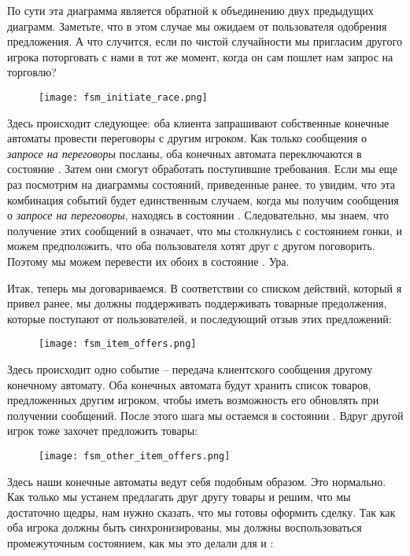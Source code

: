 По сути эта диаграмма является обратной к объединению двух предыдущих диаграмм.
Заметьте, что в этом случае мы ожидаем от пользователя одобрения предложения.
А что случится, если по чистой случайности мы пригласим другого игрока поторговать с нами в тот же момент, когда он сам пошлет нам запрос на торговлю?

\begin{figure}[H]
    \centering
    \texttt{[image: fsm\_initiate\_race.png]}
\end{figure}

Здесь происходит следующее: оба клиента запрашивают собственные конечные автоматы провести переговоры с другим игроком.
Как только сообщения о \emph{запросе на переговоры} посланы, оба конечных автомата переключаются в состояние .
Затем они смогут обработать поступившие требования.
Если мы еще раз посмотрим на диаграммы состояний, приведенные ранее, то увидим, что эта комбинация событий будет единственным случаем, когда мы получим сообщения о \emph{запросе на переговоры}, находясь в состоянии .
Следовательно, мы знаем, что получение этих сообщений в  означает, что мы столкнулись с состоянием гонки, и можем предположить, что оба пользователя хотят друг с другом поговорить.
Поэтому мы можем перевести их обоих в состояние .
Ура.

Итак, теперь мы договариваемся.
В соответствии со списком действий, который я привел ранее, мы должны поддерживать поддерживать товарные предолжения, которые поступают от пользователей, и последующий отзыв этих предложений:

\begin{figure}[H]
    \centering
    \texttt{[image: fsm\_item\_offers.png]}
\end{figure}

Здесь происходит одно событие \--- передача клиентского сообщения другому конечному автомату.
Оба конечных автомата будут хранить список товаров, предложенных другим игроком, чтобы иметь возможность его обновлять при получении сообщений.
После этого шага мы остаемся в состоянии .
Вдруг другой игрок тоже захочет предложить товары:

\begin{figure}[H]
    \centering
    \texttt{[image: fsm\_other\_item\_offers.png]}
\end{figure}

Здесь наши конечные автоматы ведут себя подобным образом.
Это нормально.
Как только мы устанем предлагать друг другу товары и решим, что мы достаточно щедры, нам нужно сказать, что мы готовы оформить сделку.
Так как оба игрока должны быть синхронизированы, мы должны воспользоваться промежуточным состоянием, как мы это делали для  и :

